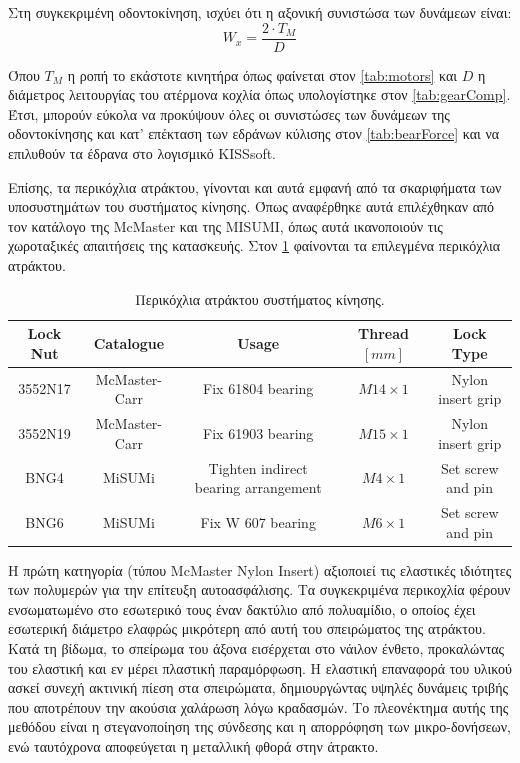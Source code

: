 Στη συγκεκριμένη οδοντοκίνηση, ισχύει ότι η αξονική συνιστώσα των δυνάμεων είναι:
\begin{equation}
    W_x = \frac{2\cdot T_M}{D}
\end{equation}

Όπου $T_M$ η ροπή το εκάστοτε κινητήρα όπως φαίνεται στον \ref{tab:motors} και $D$ η διάμετρος λειτουργίας του ατέρμονα κοχλία όπως υπολογίστηκε στον \ref{tab:gearComp}. Έτσι, μπορούν εύκολα να προκύψουν όλες οι συνιστώσες των δυνάμεων της οδοντοκίνησης και κατ' επέκταση των εδράνων κύλισης στον \ref{tab:bearForce} και να επιλυθούν τα έδρανα στο λογισμικό KISSsoft.







\par Επίσης, τα περικόχλια ατράκτου, γίνονται και αυτά εμφανή από τα σκαριφήματα των υποσυστημάτων του συστήματος κίνησης. Όπως αναφέρθηκε αυτά επιλέχθηκαν από τον κατάλογο της McMaster και της MISUMI, όπως αυτά ικανοποιούν τις χωροταξικές απαιτήσεις της κατασκευής. Στον \ref{tab:locknutBOM} φαίνονται τα επιλεγμένα περικόχλια ατράκτου.

\begin{table}[H]
    \centering
\begin{tabular}{|c|c|c|c|c|}
\hline
\rowcolor{Dandelion}
Lock Nut & Catalogue & Usage & Thread $[mm]$ & Lock Type\\
\hline

3552N17 & McMaster-Carr & Fix 61804 bearing & $M14\times1$ & Nylon insert grip \\
\hline
3552N19 & McMaster-Carr & Fix 61903 bearing & $M15\times1$ & Nylon insert grip \\
\hline
BNG4 & MiSUMi & Tighten indirect bearing arrangement & $M4\times1$ & Set screw and pin \\
\hline
BNG6 & MiSUMi & Fix W 607 bearing & $M6\times1$ & Set screw and pin \\
\hline


\end{tabular}

    \caption{Περικόχλια ατράκτου συστήματος κίνησης.}
    \label{tab:locknutBOM}
\end{table}

\par Η πρώτη κατηγορία (τύπου McMaster Nylon Insert) αξιοποιεί τις ελαστικές ιδιότητες των πολυμερών για την επίτευξη αυτοασφάλισης. Τα συγκεκριμένα περικοχλία φέρουν ενσωματωμένο στο εσωτερικό τους έναν δακτύλιο από πολυαμίδιο, ο οποίος έχει εσωτερική διάμετρο ελαφρώς μικρότερη από αυτή του σπειρώματος της ατράκτου. Κατά τη βίδωμα, το σπείρωμα του άξονα εισέρχεται στο νάιλον ένθετο, προκαλώντας του ελαστική και εν μέρει πλαστική παραμόρφωση. Η ελαστική επαναφορά του υλικού ασκεί συνεχή ακτινική πίεση στα σπειρώματα, δημιουργώντας υψηλές δυνάμεις τριβής που αποτρέπουν την ακούσια χαλάρωση λόγω κραδασμών. Το πλεονέκτημα αυτής της μεθόδου είναι η στεγανοποίηση της σύνδεσης και η απορρόφηση των μικρο-δονήσεων, ενώ ταυτόχρονα αποφεύγεται η μεταλλική φθορά στην άτρακτο.

